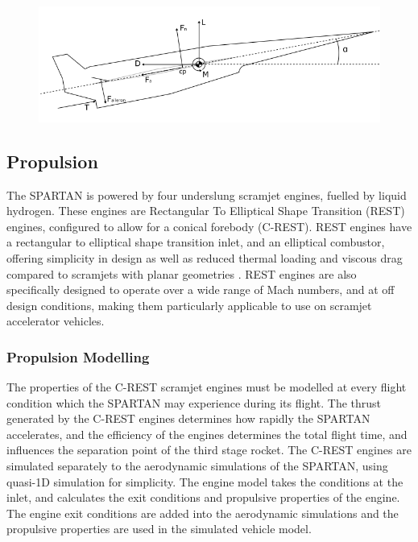 		
\begin{figure}
\centering
\includegraphics[width=0.7\linewidth]{figures/3_vehicle_design/SPARTANForces}
\caption{}
\label{fig:SPARTANForces}
\end{figure}

\subsection{Propulsion}


The SPARTAN is powered by four underslung scramjet engines, fuelled by liquid hydrogen. These engines are Rectangular To Elliptical Shape Transition (REST) engines, configured to allow for a conical forebody (C-REST). REST engines have a rectangular to elliptical shape transition inlet, and an elliptical combustor, offering simplicity in design as well as reduced thermal loading and viscous drag compared to scramjets with planar geometries \cite{Suraweera2009}.  REST engines are also specifically designed to operate over a wide range of Mach numbers, and at off design conditions, making them particularly applicable to use on scramjet accelerator vehicles. 


\subsubsection{Propulsion Modelling}

The properties of the C-REST scramjet engines must be modelled at every flight condition which the SPARTAN may experience during its flight. The thrust generated by the C-REST engines determines how rapidly the SPARTAN accelerates, and the efficiency of the engines determines the total flight time, and influences the separation point of the third stage rocket. The C-REST engines are simulated separately to the aerodynamic simulations of the SPARTAN, using quasi-1D simulation for simplicity. The engine model takes the conditions at the inlet, and calculates the exit conditions and propulsive properties of the engine. The engine exit conditions are added into the aerodynamic simulations and the propulsive properties are used in the simulated vehicle model.

